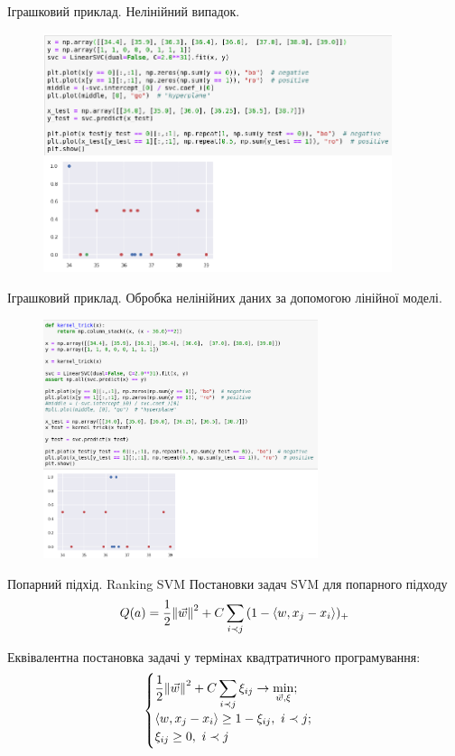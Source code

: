 \documentclass[10pt]{beamer}
\newcommand{\ip}[2]{{\langle #1, #2 \rangle}}
\begin{document}
\begin{frame}{Іграшковий приклад. Нелінійний випадок.}
    \begin{center}
        \begin{figure}
        \includegraphics[height=7cm]{images/svm-example-non-linear-problems.png}
        \end{figure}
    \end{center}
\end{frame}

\begin{frame}{Іграшковий приклад. Обробка нелінійних даних за допомогою лінійної моделі.}
    \begin{center}
        \begin{figure}
        \includegraphics[height=7cm]{images/svm-example-non-linear-problems-fix.png}
        \end{figure}
    \end{center}
\end{frame}


\begin{frame}{Попарний підхід. Ranking SVM}
Постановки задач SVM для попарного підходу
\begin{equation}
Q(a) = \frac{1}{2}\norm{\vec{w}}^{2} + C\sum_{i \prec j}{(1 - \ip{w}{x_{j} - x_{i}})_{+}}
\end{equation}

Еквівалентна постановка задачі у термінах квадтратичного програмування:
\[
\begin{cases}
\displaystyle
\frac{1}{2}\norm{\vec{w}}^{2} + C\sum_{i \prec j}{\xi_{ij}} \rightarrow \min_{\vec{w}, \xi}; \\
\ip{w}{x_{j} - x_{i}} \geq 1 - \xi_{ij},~i \prec j;\\
\xi_{ij} \geq 0,~ i \prec j\\
\end{cases}
\]
\end{frame}
\end{document}
